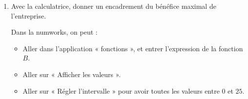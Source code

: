 \documentclass[
	classe=$1^{ere}STI2D$,
	headerTitle=Activité,
	twocolumn,
	landscape
]{exercice}
\begin{document}
{\begin{enumerate}
		      Remplir alors la dernière ligne du tableau de signes.
		\item Avec la calculatrice, donner un encadrement du bénéfice maximal de l'entreprise. \medskip

		      Dans la numworks, on peut :

		      \begin{itemize}
			      \item Aller dans l'application « fonctions », et entrer l'expression de la fonction $B$.
			      \item Aller sur « Afficher les valeurs ».
			      \item Aller sur « Régler l'intervalle » pour avoir toutes les valeurs entre $0$ et $25$.
		      \end{itemize}

		      \ifdefined\makeCorrection
			      \newcommand{\cellWidth}{1.2}
			      \begin{center}
			      \end{center}
		      \fi
	\end{enumerate}
}

\Enonce

\ifdefined\makeCorrection
\else
	\newpage
	\Enonce
\fi
\end{document}
